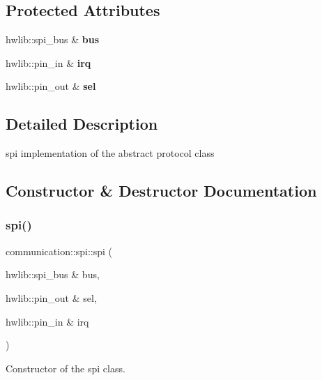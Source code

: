 \subsection*{Protected Attributes}
\begin{DoxyCompactItemize}
\item 
\mbox{\label{classcommunication_1_1spi_aff856ee2a9c21ed9d21db799803ba5b7}} 
hwlib\+::spi\+\_\+bus \& {\bfseries bus}
\item 
\mbox{\label{classcommunication_1_1spi_ad2c7ba1b50ddf6df08778ed9de3815ca}} 
hwlib\+::pin\+\_\+in \& {\bfseries irq}
\item 
\mbox{\label{classcommunication_1_1spi_af6fab0d81743fe0e0bfa9c34ada8506a}} 
hwlib\+::pin\+\_\+out \& {\bfseries sel}
\end{DoxyCompactItemize}


\subsection{Detailed Description}
spi implementation of the abstract protocol class 

\subsection{Constructor \& Destructor Documentation}
\mbox{\label{classcommunication_1_1spi_a60e6796f1d142783105b9016e782fbc2}} 
\subsubsection{\texorpdfstring{spi()}{spi()}}
{\footnotesize\ttfamily communication\+::spi\+::spi (\begin{DoxyParamCaption}\item[{hwlib\+::spi\+\_\+bus \&}]{bus,  }\item[{hwlib\+::pin\+\_\+out \&}]{sel,  }\item[{hwlib\+::pin\+\_\+in \&}]{irq }\end{DoxyParamCaption})}



Constructor of the spi class. 



